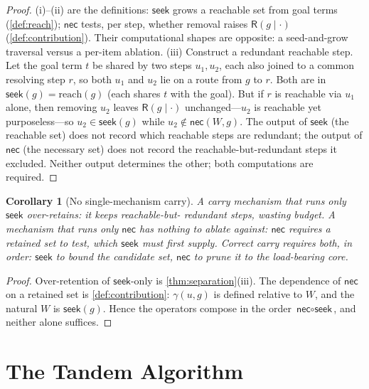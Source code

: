 \documentclass[11pt,twocolumn,a4paper]{article}
\theoremstyle{thmstyle}
\newtheorem{corollary}[theorem]{Corollary}
\theoremstyle{definition}
\theoremstyle{remark}
\newcommand{\goal}{g}                   %
\newcommand{\reach}{\mathrm{reach}}
\newcommand{\Res}{\mathsf{R}}           %
\newcommand{\contrib}{\gamma}           %
\newcommand{\seek}{\textsf{seek}}
\newcommand{\nec}{\textsf{nec}}
\begin{document}
\begin{proof}
(i)--(ii) are the definitions: $\seek$ grows a reachable set from goal terms
(\cref{def:reach}); $\nec$ tests, per step, whether removal raises
$\Res(\goal\mid\cdot)$ (\cref{def:contribution}). Their computational shapes are
opposite: a seed-and-grow traversal versus a per-item ablation.
(iii) Construct a redundant reachable step. Let the goal term $t$ be shared by
two steps $u_1,u_2$, each also joined to a common resolving step $r$, so both
$u_1$ and $u_2$ lie on a route from $\goal$ to $r$. Both are in
$\seek(\goal)=\reach(\goal)$ (each shares $t$ with the goal). But if $r$ is
reachable via $u_1$ alone, then removing $u_2$ leaves $\Res(\goal\mid\cdot)$
unchanged---$u_2$ is reachable yet purposeless---so $u_2\in\seek(\goal)$ while
$u_2\notin\nec(W,\goal)$. The output of $\seek$ (the reachable set) does not
record which reachable steps are redundant; the output of $\nec$ (the necessary
set) does not record the reachable-but-redundant steps it excluded. Neither
output determines the other; both computations are required.
\end{proof}

\begin{corollary}[No single-mechanism carry]
\label{cor:no-single}
A carry mechanism that runs only $\seek$ over-retains: it keeps reachable-but-%
redundant steps, wasting budget. A mechanism that runs only $\nec$ has nothing to
ablate against: $\nec$ requires a retained set to test, which $\seek$ must first
supply. Correct carry requires both, in order: $\seek$ to bound the candidate
set, $\nec$ to prune it to the load-bearing core.
\end{corollary}

\begin{proof}
Over-retention of $\seek$-only is \cref{thm:separation}(iii). The dependence of
$\nec$ on a retained set is \cref{def:contribution}: $\contrib(u,\goal)$ is
defined relative to $W$, and the natural $W$ is $\seek(\goal)$. Hence the
operators compose in the order $\nec\circ\seek$, and neither alone suffices.
\end{proof}

\section{The Tandem Algorithm}
\label{sec:tandem}
\end{document}
